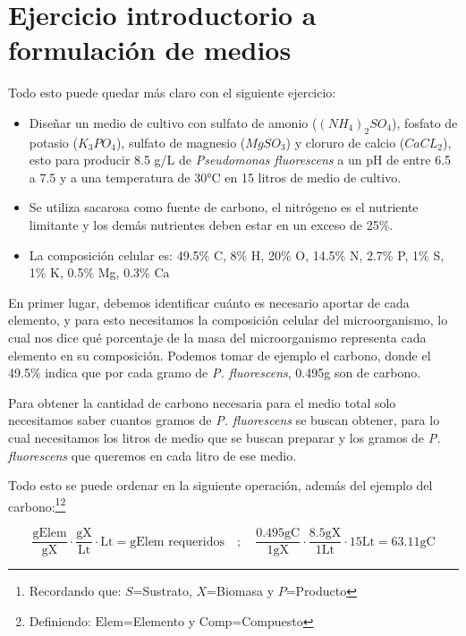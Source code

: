 \section{Ejercicio introductorio a formulación de medios} \label{sec:formulación_ej1} 

Todo esto puede quedar más claro con el siguiente ejercicio:

\begin{itemize}
    \item Diseñar un medio de cultivo con sulfato de amonio ($(NH_{4})_{2}SO_{4}$), fosfato de potasio ($K_{3}PO_{4}$), sulfato de magnesio ($MgSO_{3}$) y cloruro de calcio ($CaCL_{2}$), esto para producir 8.5 g/L de \textit{Pseudomonas fluorescens} a un pH de entre 6.5 a 7.5 y a una temperatura de 30°C en 15 litros de medio de cultivo.
    \item Se utiliza sacarosa como fuente de carbono, el nitrógeno es el nutriente limitante y los demás nutrientes deben estar en un exceso de 25\%.
    \item La composición celular es: 49.5\% C, 8\% H, 20\% O, 14.5\% N, 2.7\% P, 1\% S, 1\% K, 0.5\% Mg, 0.3\% Ca
\end{itemize}


En primer lugar, debemos identificar cuánto es necesario aportar de cada elemento, y para esto necesitamos la composición celular del microorganismo, lo cual nos dice qué porcentaje de la masa del microorganismo representa cada elemento en su composición. Podemos tomar de ejemplo el carbono, donde el 49.5\% indica que por cada gramo de \textit{P. fluorescens}, 0.495g son de carbono.

Para obtener la cantidad de carbono necesaria para el medio total solo necesitamos saber cuantos gramos de \textit{P. fluorescens} se buscan obtener, para lo cual necesitamos los litros de medio que se buscan preparar y los gramos de \textit{P. fluorescens} que queremos en cada litro de ese medio.

Todo esto se puede ordenar en la siguiente operación, además del ejemplo del carbono:\footnote{Recordando que: $S$=Sustrato, $X$=Biomasa y $P$=Producto}\footnote{Definiendo: $\text{Elem}$=Elemento y $\text{Comp}$=Compuesto}

\begin{equation}\label{eq:g_elemento}
    \frac{\text{gElem}}{\text{gX}} \cdot \frac{\text{gX}}{\text{Lt}} \cdot \text{Lt} = \text{gElem requeridos} \quad ; \quad \frac{0.495\text{gC}}{1\text{gX}} \cdot \frac{8.5\text{gX}}{1\text{Lt}} \cdot 15\text{Lt} = 63.11\text{gC}
\end{equation}

